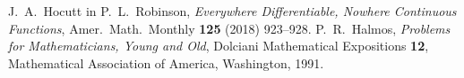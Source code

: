 \documentclass[a4paper,12pt]{article}
\theoremstyle{definition}
\theoremstyle{plain}
\begin{document}
\begin{thebibliography}{1}
    J.~A.~Hocutt in P.~L.~Robinson, \emph{Everywhere Differentiable, Nowhere Continuous Functions}, Amer.~Math.~Monthly \textbf{125} (2018) 923--928.
    P.~R.~Halmos, \emph{Problems for Mathematicians, Young and Old}, Dolciani Mathematical Expositions \textbf{12}, Mathematical Association of America, Washington, 1991.
\end{thebibliography}
\end{document}

